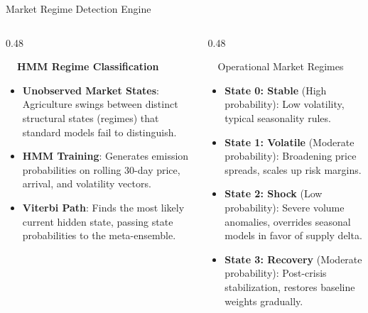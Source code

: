 \documentclass{beamer}
\begin{document}
\begin{frame}{Market Regime Detection Engine}
\vspace{-0.2cm}

\begin{columns}[T]
    \begin{column}{0.48\textwidth}
        \begin{smallcard}[0.98\textwidth, top=3pt, bottom=3pt, left=4pt, right=4pt, boxsep=0.5pt]
            \centering \textbf{\textcolor{primaryDark}{\small {}~~HMM Regime Classification}}
            \vspace{0.08cm}
            \fontsize{6.8pt}{8.2pt}\selectfont
            \begin{itemize}\setlength\itemsep{4.5pt}\setlength\parskip{0pt}
                \item \textbf{Unobserved Market States}: Agriculture swings between distinct structural states (regimes) that standard models fail to distinguish.
                \item \textbf{HMM Training}: Generates emission probabilities on rolling 30-day price, arrival, and volatility vectors.
                \item \textbf{Viterbi Path}: Finds the most likely current hidden state, passing state probabilities to the meta-ensemble.
            \end{itemize}
        \end{smallcard}
    \end{column}
    
    \begin{column}{0.48\textwidth}
        \begin{orangecard}[height=4.8cm]{~~Operational Market Regimes}
            \fontsize{6.8pt}{8.2pt}\selectfont
            \begin{itemize}\setlength\itemsep{3pt}\setlength\parskip{0pt}
                \item \textbf{State 0: Stable} (High probability): Low volatility, typical seasonality rules.
                \item \textbf{State 1: Volatile} (Moderate probability): Broadening price spreads, scales up risk margins.
                \item \textbf{State 2: Shock} (Low probability): Severe volume anomalies, overrides seasonal models in favor of supply delta.
                \item \textbf{State 3: Recovery} (Moderate probability): Post-crisis stabilization, restores baseline weights gradually.
            \end{itemize}
        \end{orangecard}
    \end{column}
\end{columns}


\end{frame}
\end{document}
